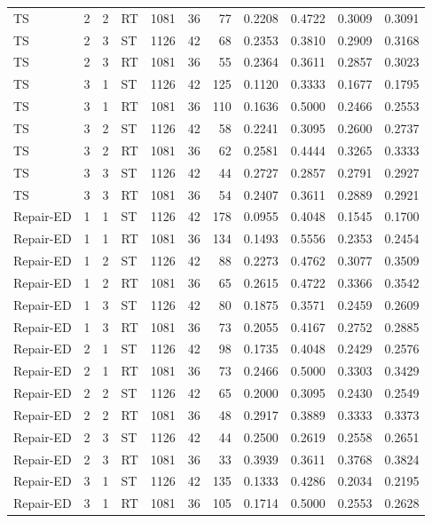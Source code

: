 {\begin{longtable}{@{}lcclrrrrrrr@{}}
TS & 2 & 2 & RT & 1081 & 36 & 77 & 0.2208 & 0.4722 & 0.3009 & 0.3091\\
TS & 2 & 3 & ST & 1126 & 42 & 68 & 0.2353 & 0.3810 & 0.2909 & 0.3168\\
TS & 2 & 3 & RT & 1081 & 36 & 55 & 0.2364 & 0.3611 & 0.2857 & 0.3023\\
TS & 3 & 1 & ST & 1126 & 42 & 125 & 0.1120 & 0.3333 & 0.1677 & 0.1795\\
TS & 3 & 1 & RT & 1081 & 36 & 110 & 0.1636 & 0.5000 & 0.2466 & 0.2553\\
TS & 3 & 2 & ST & 1126 & 42 & 58 & 0.2241 & 0.3095 & 0.2600 & 0.2737\\
TS & 3 & 2 & RT & 1081 & 36 & 62 & 0.2581 & 0.4444 & 0.3265 & 0.3333\\
TS & 3 & 3 & ST & 1126 & 42 & 44 & 0.2727 & 0.2857 & 0.2791 & 0.2927\\
TS & 3 & 3 & RT & 1081 & 36 & 54 & 0.2407 & 0.3611 & 0.2889 & 0.2921\\
\midrule
Repair-ED & 1 & 1 & ST & 1126 & 42 & 178 & 0.0955 & 0.4048 & 0.1545 & 0.1700\\
Repair-ED & 1 & 1 & RT & 1081 & 36 & 134 & 0.1493 & 0.5556 & 0.2353 & 0.2454\\
Repair-ED & 1 & 2 & ST & 1126 & 42 & 88 & 0.2273 & 0.4762 & 0.3077 & 0.3509\\
Repair-ED & 1 & 2 & RT & 1081 & 36 & 65 & 0.2615 & 0.4722 & 0.3366 & 0.3542\\
Repair-ED & 1 & 3 & ST & 1126 & 42 & 80 & 0.1875 & 0.3571 & 0.2459 & 0.2609\\
Repair-ED & 1 & 3 & RT & 1081 & 36 & 73 & 0.2055 & 0.4167 & 0.2752 & 0.2885\\
Repair-ED & 2 & 1 & ST & 1126 & 42 & 98 & 0.1735 & 0.4048 & 0.2429 & 0.2576\\
Repair-ED & 2 & 1 & RT & 1081 & 36 & 73 & 0.2466 & 0.5000 & 0.3303 & 0.3429\\
Repair-ED & 2 & 2 & ST & 1126 & 42 & 65 & 0.2000 & 0.3095 & 0.2430 & 0.2549\\
Repair-ED & 2 & 2 & RT & 1081 & 36 & 48 & 0.2917 & 0.3889 & 0.3333 & 0.3373\\
Repair-ED & 2 & 3 & ST & 1126 & 42 & 44 & 0.2500 & 0.2619 & 0.2558 & 0.2651\\
Repair-ED & 2 & 3 & RT & 1081 & 36 & 33 & 0.3939 & 0.3611 & 0.3768 & 0.3824\\
Repair-ED & 3 & 1 & ST & 1126 & 42 & 135 & 0.1333 & 0.4286 & 0.2034 & 0.2195\\
Repair-ED & 3 & 1 & RT & 1081 & 36 & 105 & 0.1714 & 0.5000 & 0.2553 & 0.2628\\

\end{longtable}}
